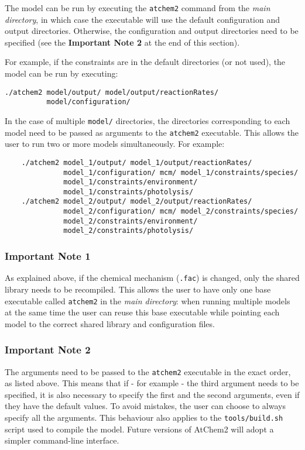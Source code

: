 The model can be run by executing the \texttt{atchem2} command from
the \emph{main directory}, in which case the executable will use the
default configuration and output directories. Otherwise, the
configuration and output directories need to be specified (see the
\textbf{Important Note 2} at the end of this section).

For example, if the constraints are in the default directories (or not
used), the model can be run by executing:

\begin{verbatim}
./atchem2 model/output/ model/output/reactionRates/
          model/configuration/
\end{verbatim}

In the case of multiple \texttt{model/} directories, the directories
corresponding to each model need to be passed as arguments to the
\texttt{atchem2} executable. This allows the user to run two or more
models simultaneously. For example:

\begin{verbatim}
    ./atchem2 model_1/output/ model_1/output/reactionRates/
              model_1/configuration/ mcm/ model_1/constraints/species/
              model_1/constraints/environment/
              model_1/constraints/photolysis/
    ./atchem2 model_2/output/ model_2/output/reactionRates/
              model_2/configuration/ mcm/ model_2/constraints/species/
              model_2/constraints/environment/
              model_2/constraints/photolysis/
\end{verbatim}

\subsubsection{Important Note 1} \label{important-note-1}

As explained above, if the chemical mechanism (\texttt{.fac}) is
changed, only the shared library needs to be recompiled. This allows
the user to have only one base executable called \texttt{atchem2} in
the \emph{main directory}: when running multiple models at the same
time the user can reuse this base executable while pointing each model
to the correct shared library and configuration files.

\subsubsection{Important Note 2} \label{important-note-2}

The arguments need to be passed to the \texttt{atchem2} executable in
the exact order, as listed above. This means that if - for example -
the third argument needs to be specified, it is also necessary to
specify the first and the second arguments, even if they have the
default values. To avoid mistakes, the user can choose to always
specify all the arguments. This behaviour also applies to the
\texttt{tools/build.sh} script used to compile the model. Future
versions of AtChem2 will adopt a simpler command-line interface.

